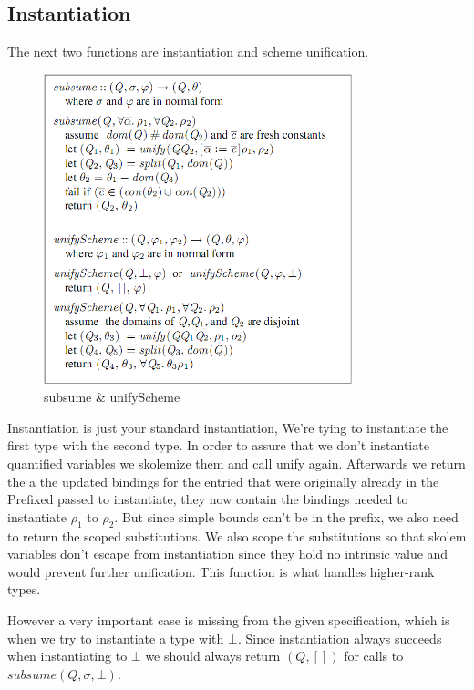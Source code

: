 \documentclass[12pt, a4paper, oneside]{article}
\begin{document}
\subsection{Instantiation}
The next two functions are instantiation and scheme unification.

\begin{figure}[h!]
  \centering
    \includegraphics[width=0.8\textwidth]{subsume}
  \caption{subsume \& unifyScheme}
\end{figure}

Instantiation is just your standard instantiation, We're tying to instantiate the first type with the second type. In order to assure that we don't instantiate quantified variables we skolemize them and call unify again. Afterwards we return the a the updated bindings for the entried that were originally already in the Prefixed passed to instantiate, they now contain the bindings needed to instantiate $\rho_1$ to $\rho_2$. But since simple bounds can't be in the prefix, we also need to return the scoped substitutions. We also scope the substitutions so that skolem variables don't escape from instantiation since they hold no intrinsic value and would prevent further unification. This function is what handles higher-rank types.

However a very important case is missing from the given specification, which is when we try to instantiate a type with $\bot$. Since instantiation always succeeds when instantiating to $\bot$ we should always return $(Q, [])$ for calls to $subsume(Q, \sigma, \bot)$.
\end{document}
